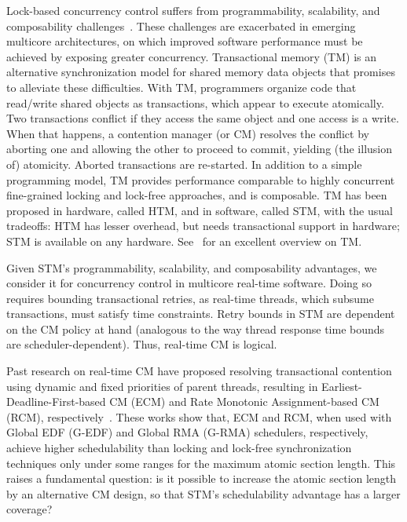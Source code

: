 \documentclass[conference]{IEEEtran}
\begin{document}
Lock-based concurrency control suffers from programmability, scalability, and composability challenges~\cite{Herlihy:2006:AMP:1146381.1146382}. These challenges are exacerbated in emerging multicore architectures, on which improved software performance must be achieved by exposing greater concurrency.  Transactional memory (TM) is an alternative synchronization model for shared memory data objects that promises to alleviate these difficulties.  With TM, programmers organize code that read/write shared objects as transactions, which appear to execute atomically. Two transactions conflict if they access the same object and one access is a write. When that happens, a contention manager (or CM)
resolves the conflict by aborting one and allowing the other to proceed to commit, yielding (the illusion of) atomicity. Aborted transactions are re-started.
In addition to a simple programming model, TM provides performance comparable to highly concurrent fine-grained locking and lock-free approaches,  
and is composable. 
TM has been proposed in hardware, called HTM,  
and in software, called STM,  
with the usual tradeoffs: HTM has lesser overhead, but needs transactional support in hardware; STM is available on any hardware. See~\cite{tm-book10} for an excellent overview on TM.


Given STM's programmability, scalability, and composability advantages, we consider it for concurrency control in multicore real-time software. Doing so requires bounding transactional  retries, as real-time threads, which subsume transactions, must satisfy time constraints.  Retry bounds in STM are dependent on the CM policy at hand (analogous to the way thread response time bounds are scheduler-dependent). 
Thus, real-time CM is logical.

Past research on real-time CM have proposed resolving transactional contention using dynamic and fixed priorities of parent threads, resulting in Earliest-Deadline-First-based CM (ECM) and Rate Monotonic Assignment-based CM (RCM), respectively~\cite{fahmy2009bounding,fahmy2009response,stmconcurrencycontrol:emsoft11}.
These works show that, ECM and RCM, when used with Global EDF (G-EDF) and Global RMA  (G-RMA) schedulers, respectively, achieve higher schedulability than locking and lock-free synchronization techniques only under some ranges for the maximum atomic section length. This raises a fundamental question: is it possible to increase the atomic section length by an alternative CM design, so that STM's schedulability advantage has a larger coverage? 
\end{document}
